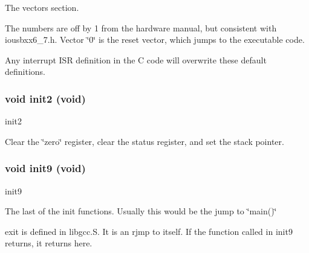 The vectors section. 

The numbers are off by 1 from the hardware manual, but consistent with iousbxx6\_\-7.h. Vector \char`\"{}0\char`\"{} is the reset vector, which jumps to the executable code.

Any interrupt ISR definition in the C code will overwrite these default definitions. 
\subsubsection{\setlength{\rightskip}{0pt plus 5cm}void init2 (void)}\label{crt0_8c_a4061ed2b7f0bd39d5b6dfb89feab723}


init2 

Clear the \char`\"{}zero\char`\"{} register, clear the status register, and set the stack pointer. 
\subsubsection{\setlength{\rightskip}{0pt plus 5cm}void init9 (void)}\label{crt0_8c_16bccc8605ebdf78fd0649215c467679}


init9 

The last of the init functions. Usually this would be the jump to \char`\"{}main()\char`\"{}

exit is defined in libgcc.S. It is an rjmp to itself. If the function called in init9 returns, it returns here. 